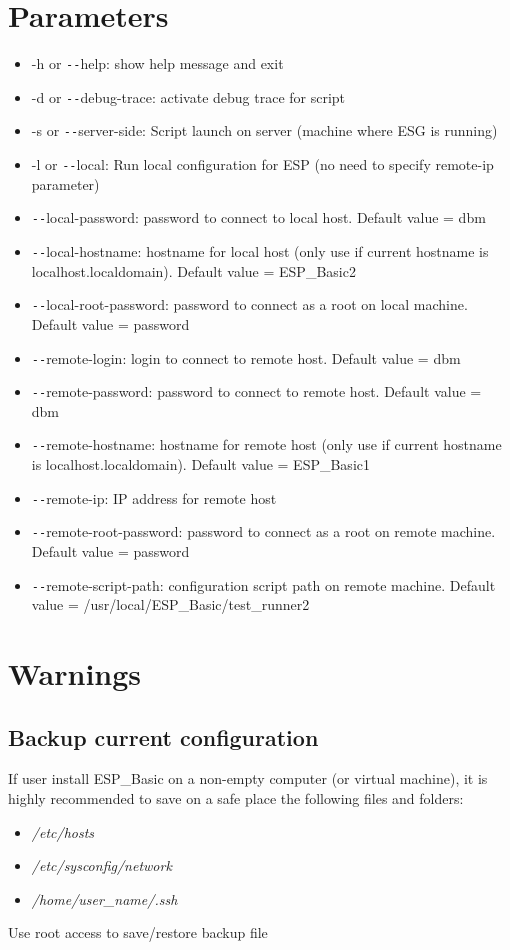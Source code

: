 \section{Parameters}
\begin{itemize}
\item -h or \verb!--!help: show help message and exit
\item -d or \verb!--!debug-trace: activate debug trace for script
\item -s or \verb!--!server-side: Script launch on server (machine where ESG is running)
\item -l or \verb!--!local: Run local configuration for ESP (no need to specify remote-ip parameter)
\item \verb!--!local-password: password to connect to local host. Default value = dbm
\item \verb!--!local-hostname: hostname for local host (only use if current hostname is localhost.localdomain). Default value = ESP\_Basic2
\item \verb!--!local-root-password: password to connect as a root on local machine. Default value = password
\item \verb!--!remote-login: login to connect to remote host. Default value = dbm
\item \verb!--!remote-password: password to connect to remote host. Default value = dbm
\item \verb!--!remote-hostname: hostname for remote host (only use if current hostname is localhost.localdomain). Default value = ESP\_Basic1
\item \verb!--!remote-ip: IP address for remote host
\item \verb!--!remote-root-password: password to connect as a root on remote machine. Default value = password
\item \verb!--!remote-script-path: configuration script path on remote machine. Default value = /usr/local/ESP\_Basic/test\_runner2
\end{itemize}

\section{Warnings}
\subsection{Backup current configuration}
If user install ESP\_Basic on a non-empty computer (or virtual machine), it is highly recommended to save on a safe place the following files and folders:
\begin{itemize}
\item \emph{/etc/hosts} 
\item \emph{/etc/sysconfig/network}
\item \emph{/home/\emph{user\_name}/.ssh}
\end{itemize}
Use root access to save/restore backup file

